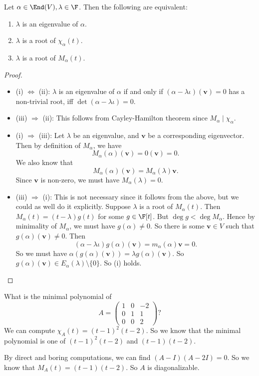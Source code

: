 \documentclass[a4paper]{article}
\begin{document}
\begin{lemma}
  Let $\alpha \in \End(V), \lambda \in \F$. Then the following are equivalent:
  \begin{enumerate}
    \item $\lambda$ is an eigenvalue of $\alpha$.
    \item $\lambda$ is a root of $\chi_\alpha(t)$.
    \item $\lambda$ is a root of $M_\alpha(t)$.
  \end{enumerate}
\end{lemma}

\begin{proof}\leavevmode
  \begin{itemize}
    \item (i) $\Leftrightarrow$ (ii): $\lambda$ is an eigenvalue of $\alpha$ if and only if $(\alpha - \lambda \iota)(\mathbf{v}) = 0$ has a non-trivial root, iff $\det(\alpha - \lambda \iota) = 0$.
    \item (iii) $\Rightarrow$ (ii): This follows from Cayley-Hamilton theorem since $M_\alpha \mid \chi_\alpha$.
    \item (i) $\Rightarrow$ (iii): Let $\lambda$ be an eigenvalue, and $\mathbf{v}$ be a corresponding eigenvector. Then by definition of $M_\alpha$, we have
      \[
        M_\alpha(\alpha)(\mathbf{v}) = 0(\mathbf{v}) = 0.
      \]
      We also know that
      \[
        M_\alpha(\alpha)(\mathbf{v}) = M_\alpha(\lambda)\mathbf{v}.
      \]
      Since $\mathbf{v}$ is non-zero, we must have $M_\alpha(\lambda) =0$.

    \item (iii) $\Rightarrow$ (i): This is not necessary since it follows from the above, but we could as well do it explicitly. Suppose $\lambda$ is a root of $M_\alpha(t)$. Then $M_\alpha(t) = (t - \lambda) g(t)$ for some $g \in \F[t]$. But $\deg g < \deg M_\alpha$. Hence by minimality of $M_\alpha$, we must have $g(\alpha) \not= 0$. So there is some $\mathbf{v}\in V$ such that $g(\alpha)(\mathbf{v}) \not=0$. Then
      \[
        (\alpha - \lambda\iota)g(\alpha)(\mathbf{v}) = m_\alpha(\alpha)\mathbf{v} = 0.
      \]
      So we must have $\alpha (g(\alpha)(\mathbf{v})) = \lambda g(\alpha)(\mathbf{v})$. So $g(\alpha)(\mathbf{v}) \in E_\alpha(\lambda) \setminus \{0\}$. So (i) holds.
  \end{itemize}
\end{proof}

\begin{eg}
  What is the minimal polynomial of
  \[
    A =
    \begin{pmatrix}
      1 & 0 & -2\\
      0 & 1 & 1\\
      0 & 0 & 2
    \end{pmatrix}?
  \]
  We can compute $\chi_A(t) = (t - 1)^2 (t - 2)$. So we know that the minimal polynomial is one of $(t - 1)^2(t - 2)$ and $(t - 1)(t - 2)$.

  By direct and boring computations, we can find $(A - I)(A - 2I) = 0$. So we know that $M_A(t) = (t - 1)(t - 2)$. So $A$ is diagonalizable.
\end{eg}
\end{document}

